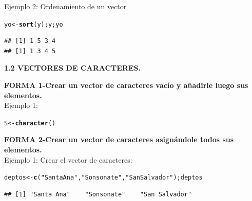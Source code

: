 \documentclass[12pt,letterpaper]{article}\usepackage[]{graphicx}\usepackage[]{color}
\makeatletter
\newcommand{\hlstr}[1]{\textcolor[rgb]{0.192,0.494,0.8}{#1}}%
\newcommand{\hlstd}[1]{\textcolor[rgb]{0.345,0.345,0.345}{#1}}%
\newcommand{\hlkwb}[1]{\textcolor[rgb]{0.69,0.353,0.396}{#1}}%
\newcommand{\hlkwd}[1]{\textcolor[rgb]{0.737,0.353,0.396}{\textbf{#1}}}%
\newenvironment{kframe}{%
 \def\at@end@of@kframe{}%
 \ifinner\ifhmode%
  \def\at@end@of@kframe{\end{minipage}}%
  \begin{minipage}{\columnwidth}%
 \fi\fi%
 \def\FrameCommand##1{\hskip\@totalleftmargin \hskip-\fboxsep
 \colorbox{shadecolor}{##1}\hskip-\fboxsep
     \hskip-\linewidth \hskip-\@totalleftmargin \hskip\columnwidth}%
 \MakeFramed {\advance\hsize-\width
   \@totalleftmargin\z@ \linewidth\hsize
   \@setminipage}}%
 {\par\unskip\endMakeFramed%
 \at@end@of@kframe}
\newenvironment{knitrout}{}{} %
\makeatother
\begin{document}
Ejemplo 2: Ordenamiento de un vector
\begin{knitrout}
\color{fgcolor}\begin{kframe}
\begin{alltt}
\hlstd{yo} \hlkwb{<-} \hlkwd{sort}\hlstd{(y); y;yo}
\end{alltt}
\begin{verbatim}
## [1] 1 5 3 4
## [1] 1 3 4 5
\end{verbatim}
\end{kframe}
\end{knitrout}

\begin{center}
\textbf{1.2 VECTORES DE CARACTERES.}\\
\end{center}

\textbf{FORMA 1-Crear un vector de caracteres vac\'io y a\~nadirle luego sus elementos.}\\

Ejemplo 1:
\begin{knitrout}
\color{fgcolor}\begin{kframe}
\begin{alltt}
\hlstd{S}\hlkwb{<-}\hlkwd{character}\hlstd{()}
\end{alltt}
\end{kframe}
\end{knitrout}

\textbf{FORMA 2-Crear un vector de caracteres asign\'andole todos sus elementos.}\\

Ejemplo 1: Crear el vector de caracteres:
\begin{knitrout}
\color{fgcolor}\begin{kframe}
\begin{alltt}
\hlstd{deptos} \hlkwb{<-} \hlkwd{c}\hlstd{(}\hlstr{"Santa Ana"}\hlstd{,} \hlstr{"Sonsonate"}\hlstd{,} \hlstr{"San Salvador"}\hlstd{); deptos}
\end{alltt}
\begin{verbatim}
## [1] "Santa Ana"    "Sonsonate"    "San Salvador"
\end{verbatim}
\end{kframe}
\end{knitrout}
\end{document}
